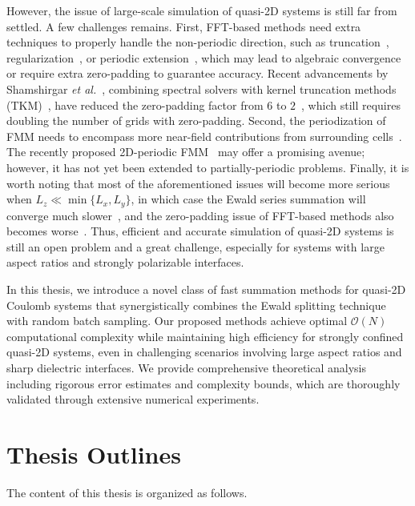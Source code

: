 However, the issue of large-scale simulation of quasi-2D systems is still far from settled.
A few challenges remains. First, FFT-based methods need extra techniques to properly handle the non-periodic direction, such as truncation~\cite{parry1975electrostatic}, regularization~\cite{nestler2015fast}, or periodic extension~\cite{lindbo2012fast}, which may lead to algebraic convergence or require extra zero-padding to guarantee accuracy. 
Recent advancements by Shamshirgar \emph{et al.}~\cite{shamshirgar2021fast}, combining spectral solvers with kernel truncation methods (TKM)~\cite{vico2016fast}, have reduced the zero-padding factor from $6$ to $2$~\cite{lindbo2012fast}, which still requires doubling the number of grids with zero-padding. 
Second, the periodization of FMM needs to encompass more near-field contributions from surrounding cells~\cite{yan2018flexibly,barnett2018unified}. The recently proposed 2D-periodic FMM~\cite{PEI2023111792} may offer a promising avenue; however, it has not yet been extended to partially-periodic problems.
Finally, it is worth noting that most of the aforementioned issues will become more serious when $L_z\ll \min\{L_x, L_y\}$, in which case the Ewald series summation will converge much slower~\cite{arnold2002electrostatics}, and the zero-padding issue of FFT-based methods also becomes worse~\cite{maxian2021fast}.
Thus, efficient and accurate simulation of quasi-2D systems is still an open problem and a great challenge, especially for systems with large aspect ratios and strongly polarizable interfaces.


In this thesis, we introduce a novel class of fast summation methods for quasi-2D Coulomb systems that synergistically combines the Ewald splitting technique with random batch sampling. 
Our proposed methods achieve optimal $\mathcal{O}(N)$ computational complexity while maintaining high efficiency for strongly confined quasi-2D systems, even in challenging scenarios involving large aspect ratios and sharp dielectric interfaces. 
We provide comprehensive theoretical analysis including rigorous error estimates and complexity bounds, which are thoroughly validated through extensive numerical experiments.

\section{Thesis Outlines}

The content of this thesis is organized as follows.

